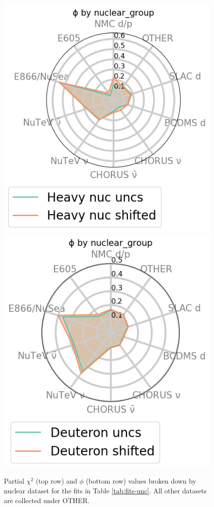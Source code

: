 \begin{figure}[H]
\begin{center}
    \includegraphics[width=0.3\linewidth]{nuclear/plots/spiderphi_2.png}
        \includegraphics[width=0.3\linewidth, trim={0 0.2cm 0 0}]{nuclear/plots/spiderphi_3.png}
    \caption{Partial $\chi^2$ (top row) and $\phi$  (bottom row) values broken down by nuclear dataset for the fits in Table \ref{tab:fits-unc}. All other datasets are collected under OTHER. 
    \label{fig:chi2phi} }
    \end{center}
\end{figure}   



